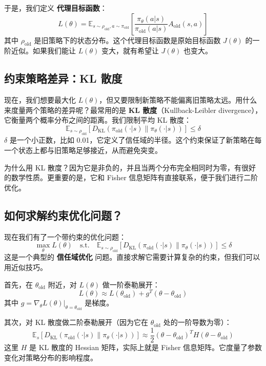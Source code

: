 \documentclass[lang=cn,zihao=-4,a4paper,fontset=windows]{beautybook}
\begin{document}
于是，我们定义 \textbf{代理目标函数}：
\[
L(\theta) = \mathbb{E}_{s \sim \rho_{\text{old}}, a \sim \pi_{\text{old}}} \left[ \frac{\pi_\theta(a|s)}{\pi_{\text{old}}(a|s)} A_{\text{old}}(s,a) \right]
\]
其中 \(\rho_{\text{old}}\) 是旧策略下的状态分布。这个代理目标函数是原始目标函数 \(J(\theta)\) 的一阶近似。如果我们能让 \(L(\theta)\) 变大，就有希望让 \(J(\theta)\) 也变大。

\subsection{约束策略差异：KL 散度}

现在，我们想要最大化 \(L(\theta)\)，但又要限制新策略不能偏离旧策略太远。用什么来度量两个策略的差异呢？最常用的是 \textbf{KL 散度}（Kullback-Leibler divergence），它衡量两个概率分布之间的距离。我们限制平均 KL 散度：
\[
\mathbb{E}_{s \sim \rho_{\text{old}}} \left[ D_{\text{KL}}(\pi_{\text{old}}(\cdot|s) \| \pi_\theta(\cdot|s)) \right] \le \delta
\]
\(\delta\) 是一个小正数，比如 0.01，它定义了信任域的半径。这个约束保证了新策略在每一个状态上都与旧策略足够接近，从而避免突变。

为什么用 KL 散度？因为它是非负的，并且当两个分布完全相同时为零，有很好的数学性质。更重要的是，它和 Fisher 信息矩阵有直接联系，便于我们进行二阶优化。

\subsection{如何求解约束优化问题？}

现在我们有了一个带约束的优化问题：
\[
\max_\theta L(\theta) \quad \text{s.t.} \quad \mathbb{E}_{s \sim \rho_{\text{old}}}[D_{\text{KL}}(\pi_{\text{old}}(\cdot|s) \| \pi_\theta(\cdot|s))] \le \delta
\]
这是一个典型的 \textbf{信任域优化} 问题。直接求解它需要计算复杂的约束，但我们可以用近似技巧。

首先，在 \(\theta_{\text{old}}\) 附近，对 \(L(\theta)\) 做一阶泰勒展开：
\[
L(\theta) \approx L(\theta_{\text{old}}) + g^T (\theta - \theta_{\text{old}})
\]
其中 \(g = \nabla_\theta L(\theta)|_{\theta=\theta_{\text{old}}}\) 是梯度。

其次，对 KL 散度做二阶泰勒展开（因为它在 \(\theta_{\text{old}}\) 处的一阶导数为零）：
\[
\mathbb{E}_{s}[D_{\text{KL}}(\pi_{\text{old}}(\cdot|s) \| \pi_\theta(\cdot|s))] \approx \frac{1}{2} (\theta - \theta_{\text{old}})^T H (\theta - \theta_{\text{old}})
\]
这里 \(H\) 是 KL 散度的 Hessian 矩阵，实际上就是 Fisher 信息矩阵。它度量了参数变化对策略分布的影响程度。
\end{document}
